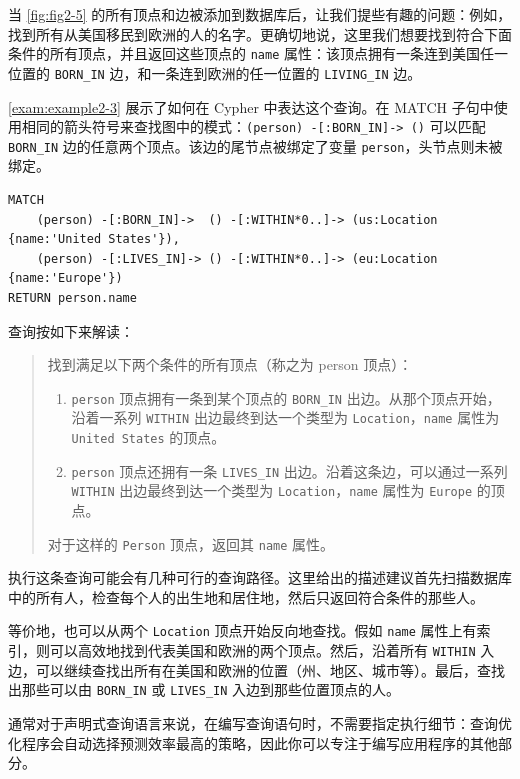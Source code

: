 当 \autoref{fig:fig2-5} 的所有顶点和边被添加到数据库后，让我们提些有趣的问题：例如，找到所有从美国移民到欧洲的人的名字。更确切地说，这里我们想要找到符合下面条件的所有顶点，并且返回这些顶点的 \texttt{name} 属性：该顶点拥有一条连到美国任一位置的 \texttt{BORN\_IN} 边，和一条连到欧洲的任一位置的 \texttt{LIVING\_IN} 边。

\autoref{exam:example2-3} 展示了如何在 Cypher 中表达这个查询。在 MATCH 子句中使用相同的箭头符号来查找图中的模式：\texttt{(person) -[:BORN\_IN]-> ()} 可以匹配 \texttt{BORN\_IN} 边的任意两个顶点。该边的尾节点被绑定了变量 \texttt{person}，头节点则未被绑定。

\begin{lstlisting}[caption={查找所有从美国移民到欧洲的人的 Cypher 查询：}]
MATCH
    (person) -[:BORN_IN]->  () -[:WITHIN*0..]-> (us:Location {name:'United States'}),
    (person) -[:LIVES_IN]-> () -[:WITHIN*0..]-> (eu:Location {name:'Europe'})
RETURN person.name
\end{lstlisting}

查询按如下来解读：

\begin{quote}
    找到满足以下两个条件的所有顶点（称之为 person 顶点）：
    \begin{enumerate}
        \item \texttt{person} 顶点拥有一条到某个顶点的 \texttt{BORN\_IN} 出边。从那个顶点开始，沿着一系列 \texttt{WITHIN} 出边最终到达一个类型为 \texttt{Location}，\texttt{name} 属性为 \texttt{United States} 的顶点。
        \item \texttt{person} 顶点还拥有一条 \texttt{LIVES\_IN} 出边。沿着这条边，可以通过一系列 \texttt{WITHIN} 出边最终到达一个类型为 \texttt{Location}，\texttt{name} 属性为 \texttt{Europe} 的顶点。
    \end{enumerate}
    对于这样的 \texttt{Person} 顶点，返回其 \texttt{name} 属性。
\end{quote}

执行这条查询可能会有几种可行的查询路径。这里给出的描述建议首先扫描数据库中的所有人，检查每个人的出生地和居住地，然后只返回符合条件的那些人。

等价地，也可以从两个 \texttt{Location} 顶点开始反向地查找。假如 \texttt{name} 属性上有索引，则可以高效地找到代表美国和欧洲的两个顶点。然后，沿着所有 \texttt{WITHIN} 入边，可以继续查找出所有在美国和欧洲的位置（州、地区、城市等）。最后，查找出那些可以由 \texttt{BORN\_IN} 或 \texttt{LIVES\_IN} 入边到那些位置顶点的人。

通常对于声明式查询语言来说，在编写查询语句时，不需要指定执行细节：查询优化程序会自动选择预测效率最高的策略，因此你可以专注于编写应用程序的其他部分。

